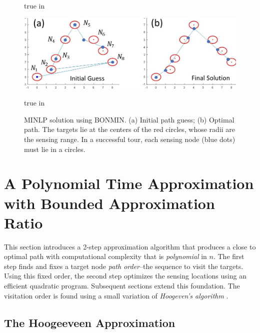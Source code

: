 \documentclass[letterpaper, 10 pt, conference]{ieeeconf}
\theoremstyle{definition}
\begin{document}
\begin{figure}[h]
   true in
\centerline{   \includegraphics[height=1.0 true in]{BONMIN_Examples.jpg} }
  \caption{MINLP solution using BONMIN. (a) Initial path guess; (b) Optimal path.  The targets lie at the centers of the red circles, whose radii are the sensing range.  In a successful tour, each sensing node (blue dots) must lie in a circles.}
  \label{fig:MINLP_example}
   true in
\end{figure}

\section{A Polynomial Time Approximation with Bounded Approximation Ratio}\label{sec:polynomial}

\noindent This section introduces a 2-step approximation algorithm that produces a close to optimal path with computational complexity that is {\em polynomial} in $n$.  The first step finds and fixes a target node {\em path order}--the sequence to visit the targets.  Using this fixed order, the second step optimizes the sensing locations using an efficient quadratic program.  Subsequent sections extend this foundation. The visitation order is found using a small variation of {\em Hoogeven's algorithm} \cite{hoogeveen_analysis_1991}.\vspace{-3pt}

\subsection{The Hoogeeveen Approximation} \label{sec:Hoogeveen}
\end{document}
